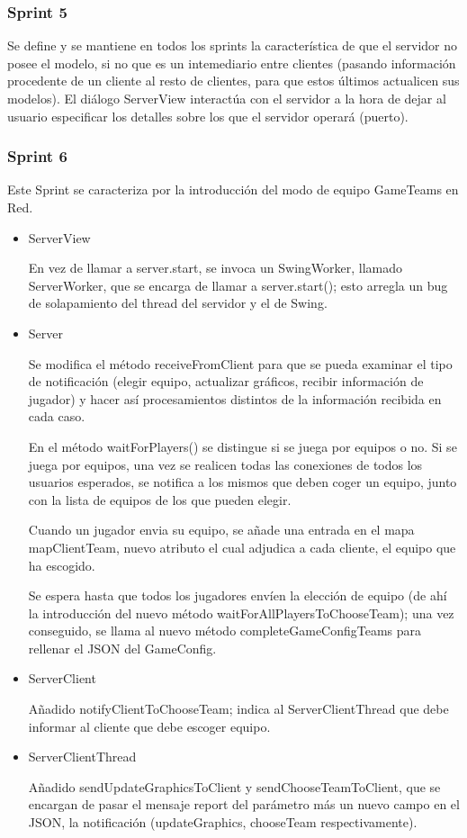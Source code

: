 \documentclass{article}
\theoremstyle{break}
\begin{document}
\subsubsection{Sprint 5}

Se define y se mantiene en todos los sprints la característica de que el servidor no posee el modelo, si no que es un intemediario entre clientes (pasando información procedente de un cliente al resto de clientes, para que estos últimos actualicen sus modelos). El diálogo ServerView interactúa con el servidor a la hora de dejar al usuario especificar los detalles sobre los que el servidor operará (puerto).

\subsubsection{Sprint 6}

Este Sprint se caracteriza por la introducción del modo de equipo GameTeams en Red.

\begin{itemize}

\item ServerView

En vez de llamar a server.start, se invoca un SwingWorker, llamado ServerWorker, que se encarga de llamar a server.start(); esto arregla un bug de solapamiento del thread del servidor y el de Swing.

\item Server

Se modifica el método receiveFromClient para que se pueda examinar el tipo de notificación (elegir equipo, actualizar gráficos, recibir información de jugador) y hacer así procesamientos distintos de la información recibida en cada caso.

En el método waitForPlayers() se distingue si se juega por equipos o no. Si se juega por equipos, una vez se realicen todas las conexiones de todos los usuarios esperados, se notifica a los mismos que deben coger un equipo, junto con la lista de equipos de los que pueden elegir.

Cuando un jugador envia su equipo, se añade una entrada en el mapa mapClientTeam, nuevo atributo el cual adjudica a cada cliente, el equipo que ha escogido.

Se espera hasta que todos los jugadores envíen la elección de equipo (de ahí la introducción del nuevo método waitForAllPlayersToChooseTeam); una vez conseguido, se llama al nuevo método completeGameConfigTeams para rellenar el JSON del GameConfig.

\item ServerClient

Añadido notifyClientToChooseTeam; indica al ServerClientThread que debe informar al cliente que debe escoger equipo.

\item ServerClientThread

Añadido sendUpdateGraphicsToClient y sendChooseTeamToClient, que se encargan de pasar el mensaje report del parámetro más un nuevo campo en el JSON, la notificación (updateGraphics, chooseTeam respectivamente).

\end{itemize}
\end{document}
